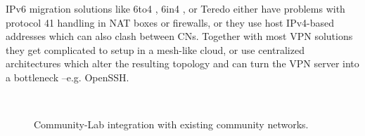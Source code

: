 \documentclass[conference]{IEEEtran}
\begin{document}

IPv6 migration solutions like 6to4 \cite{6to4}, 6in4 \cite{6in4},
or Teredo \cite{teredo} either have problems with protocol 41
handling in NAT boxes or firewalls, or they use host IPv4-based addresses which can
also clash between CNs.  Together with most VPN solutions they get complicated to
setup in a mesh-like cloud, or use centralized architectures which alter the
resulting topology and can turn the VPN server into a bottleneck --e.g. OpenSSH.


\begin{figure}[!t]
 \centering
 \\
 \caption{Community-Lab integration with existing community networks.}
\end{figure}
\end{document}

